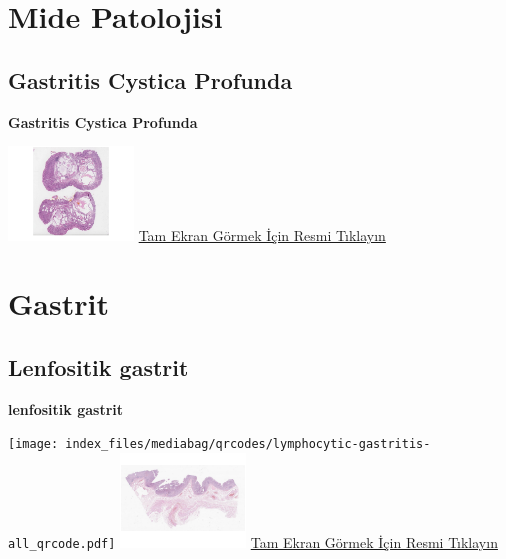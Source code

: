 \documentclass[
  letterpaper,
  DIV=11,
  numbers=noendperiod]{scrreprt}
\begin{document}
\hypertarget{sec-mide-patolojisi}{%
\chapter{Mide Patolojisi}\label{sec-mide-patolojisi}}

\hypertarget{sec-gastritis-cystica-profunda}{%
\section{Gastritis Cystica
Profunda}\label{sec-gastritis-cystica-profunda}}

\textbf{Gastritis Cystica Profunda}

\href{https://images.patolojiatlasi.com/gastritis-cystica-profunda/HE.html}{\includegraphics[width=0.25\textwidth,height=\textheight]{./screenshots/thumbnail_gastritis-cystica-profunda.png}}
\href{https://images.patolojiatlasi.com/gastritis-cystica-profunda/HE.html}{Tam
Ekran Görmek İçin Resmi Tıklayın}

\hypertarget{sec-gastrit}{%
\chapter{Gastrit}\label{sec-gastrit}}

\hypertarget{sec-lymphocytic-gastritis}{%
\section{Lenfositik gastrit}\label{sec-lymphocytic-gastritis}}

\textbf{lenfositik gastrit}

\texttt{[image: index\_files/mediabag/qrcodes/lymphocytic-gastritis-all\_qrcode.pdf]}
\href{https://images.patolojiatlasi.com/lymphocytic-gastritis/all.html}{\includegraphics[width=0.25\textwidth,height=\textheight]{./screenshots/thumbnail_lymphocytic-gastritis-all.png}}
\href{https://images.patolojiatlasi.com/lymphocytic-gastritis/all.html}{Tam
Ekran Görmek İçin Resmi Tıklayın}
\end{document}
